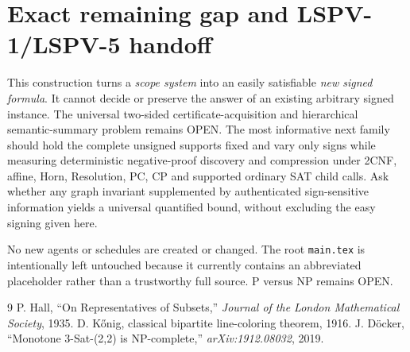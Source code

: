 \documentclass[11pt]{article}
\begin{document}
\section{Exact remaining gap and LSPV-1/LSPV-5 handoff}
This construction turns a \emph{scope system} into an easily satisfiable \emph{new signed formula}. It cannot decide or preserve the answer of an existing arbitrary signed instance. The universal two-sided certificate-acquisition and hierarchical semantic-summary problem remains OPEN. The most informative next family should hold the complete unsigned supports fixed and vary only signs while measuring deterministic negative-proof discovery and compression under 2CNF, affine, Horn, Resolution, PC, CP and supported ordinary SAT child calls. Ask whether any graph invariant supplemented by authenticated sign-sensitive information yields a universal quantified bound, without excluding the easy signing given here.

No new agents or schedules are created or changed. The root \texttt{main.tex} is intentionally left untouched because it currently contains an abbreviated placeholder rather than a trustworthy full source. P versus NP remains OPEN.

\begin{thebibliography}{9}
 P. Hall, ``On Representatives of Subsets,'' \emph{Journal of the London Mathematical Society}, 1935.
 D. K\H{o}nig, classical bipartite line-coloring theorem, 1916.
 J. D\"ocker, ``Monotone 3-Sat-(2,2) is NP-complete,'' \emph{arXiv:1912.08032}, 2019.
\end{thebibliography}
\end{document}
